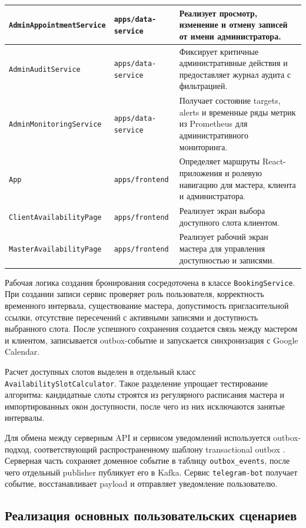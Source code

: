 \begin{xltabular}{\textwidth}{|p{5cm}|p{3.6cm}|X|}
\texttt{AdminAppointmentService} & \texttt{apps/data-service} & Реализует просмотр, изменение и отмену записей от имени администратора. \\ \hline
\texttt{AdminAuditService} & \texttt{apps/data-service} & Фиксирует критичные административные действия и предоставляет журнал аудита с фильтрацией. \\ \hline
\texttt{AdminMonitoringService} & \texttt{apps/data-service} & Получает состояние targets, alerts и временные ряды метрик из Prometheus для административного мониторинга. \\ \hline
\texttt{App} & \texttt{apps/frontend} & Определяет маршруты React-приложения и ролевую навигацию для мастера, клиента и администратора. \\ \hline
\texttt{ClientAvailabilityPage} & \texttt{apps/frontend} & Реализует экран выбора доступного слота клиентом. \\ \hline
\texttt{MasterAvailabilityPage} & \texttt{apps/frontend} & Реализует рабочий экран мастера для управления доступностью и записями. \\ \hline
\end{xltabular}
\renewcommand{\arraystretch}{1.0}

Рабочая логика создания бронирования сосредоточена в классе \texttt{BookingService}. При создании записи сервис проверяет роль пользователя, корректность временного интервала, существование мастера, допустимость пригласительной ссылки, отсутствие пересечений с активными записями и доступность выбранного слота. После успешного сохранения создается связь между мастером и клиентом, записывается outbox-событие и запускается синхронизация с Google Calendar.

Расчет доступных слотов выделен в отдельный класс \texttt{AvailabilitySlotCalculator}. Такое разделение упрощает тестирование алгоритма: кандидатные слоты строятся из регулярного расписания мастера и импортированных окон доступности, после чего из них исключаются занятые интервалы.

Для обмена между серверным API и сервисом уведомлений используется outbox-подход, соответствующий распространенному шаблону transactional outbox \cite{transactionalOutbox}. Серверная часть сохраняет доменное событие в таблицу \texttt{outbox\_events}, после чего отдельный publisher публикует его в Kafka. Сервис \texttt{telegram-bot} получает событие, восстанавливает payload и отправляет уведомление пользователю.

\subsection{Реализация основных пользовательских сценариев}

